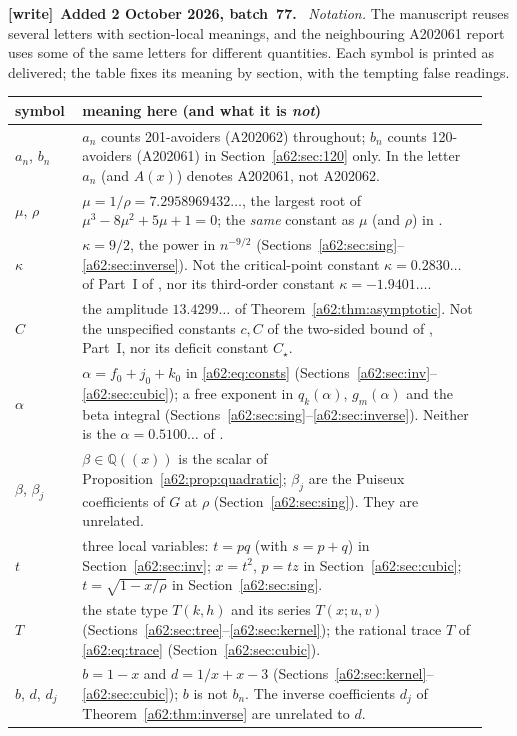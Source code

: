 \documentclass[11pt,letterpaper]{article}
\theoremstyle{remark}\newtheorem{remark}[theorem]{Remark}
\newcommand{\Q}{\mathbb Q}
\newenvironment{writenote}[1][]{\par\smallskip\begingroup\small
 \noindent\textbf{[write]}\if\relax\detokenize{#1}\relax\else~\textbf{#1.}\fi\ }%
 {\par\endgroup\smallskip}
\begin{document}
\begin{writenote}[Added 2 October 2026, batch~77]
\emph{Notation.} The manuscript reuses several letters with section-local
meanings, and the neighbouring A202061 report uses some of the same letters
for different quantities. Each symbol is printed as delivered; the table
fixes its meaning by section, with the tempting false readings.
\begin{center}\footnotesize
\begin{tabular}{@{}p{0.13\linewidth}p{0.81\linewidth}@{}}
\toprule
symbol & meaning here (and what it is \emph{not})\\
\midrule
$a_n$, $b_n$ & $a_n$ counts 201-avoiders (A202062) throughout; $b_n$ counts 120-avoiders (A202061) in Section~\ref{a62:sec:120} only. In \cite{a62-a61} the letter $a_n$ (and $A(x)$) denotes A202061, not A202062.\\
$\mu$, $\rho$ & $\mu=1/\rho=7.2958969432\ldots$, the largest root of $\mu^3-8\mu^2+5\mu+1=0$; the \emph{same} constant as $\mu$ (and $\rho$) in \cite{a62-a61}.\\
$\kappa$ & $\kappa=9/2$, the power in $n^{-9/2}$ (Sections~\ref{a62:sec:sing}--\ref{a62:sec:inverse}). Not the critical-point constant $\kappa=0.2830\ldots$ of Part~I of \cite{a62-a61}, nor its third-order constant $\kappa=-1.9401\ldots$.\\
$C$ & the amplitude $13.4299\ldots$ of Theorem~\ref{a62:thm:asymptotic}. Not the unspecified constants $c,C$ of the two-sided bound of \cite{a62-a61}, Part~I, nor its deficit constant $C_\star$.\\
$\alpha$ & $\alpha=f_0+j_0+k_0$ in \eqref{a62:eq:consts} (Sections~\ref{a62:sec:inv}--\ref{a62:sec:cubic}); a free exponent in $q_k(\alpha)$, $g_m(\alpha)$ and the beta integral (Sections~\ref{a62:sec:sing}--\ref{a62:sec:inverse}). Neither is the $\alpha=0.5100\ldots$ of \cite{a62-a61}.\\
$\beta$, $\beta_j$ & $\beta\in\Q((x))$ is the scalar of Proposition~\ref{a62:prop:quadratic}; $\beta_j$ are the Puiseux coefficients of $G$ at $\rho$ (Section~\ref{a62:sec:sing}). They are unrelated.\\
$t$ & three local variables: $t=pq$ (with $s=p+q$) in Section~\ref{a62:sec:inv}; $x=t^2$, $p=tz$ in Section~\ref{a62:sec:cubic}; $t=\sqrt{1-x/\rho}$ in Section~\ref{a62:sec:sing}.\\
$T$ & the state type $T(k,h)$ and its series $T(x;u,v)$ (Sections~\ref{a62:sec:tree}--\ref{a62:sec:kernel}); the rational trace $T$ of \eqref{a62:eq:trace} (Section~\ref{a62:sec:cubic}).\\
$b$, $d$, $d_j$ & $b=1-x$ and $d=1/x+x-3$ (Sections~\ref{a62:sec:kernel}--\ref{a62:sec:cubic}); $b$ is not $b_n$. The inverse coefficients $d_j$ of Theorem~\ref{a62:thm:inverse} are unrelated to $d$.\\

\end{tabular}
\end{center}
\end{writenote}
\end{document}
